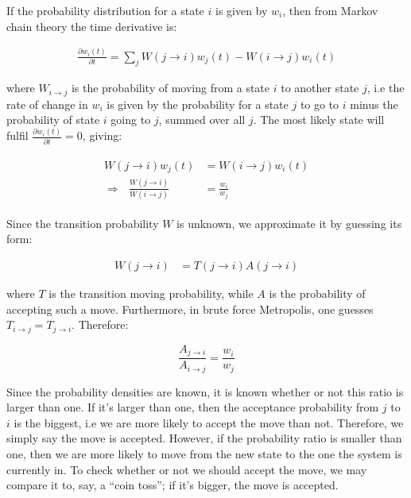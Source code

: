 \documentclass[english, a4paper]{article}
\begin{document}
	If the probability distribution for a state $i$ is given by $w_i$, then from Markov chain theory the time derivative is:
	
	\begin{align}
		\frac{\partial w_i(t)}{\partial t} = \sum_j W(j\rightarrow i)w_j(t) - W(i\rightarrow j)w_i(t)
	\end{align}
	
	where $W_{i\rightarrow j}$ is the probability of moving from a state $i$ to another state $j$, i.e the rate of change in $w_i$ is given by the probability for a state $j$ to go to $i$ minus the
	probability of state $i$ going to $j$, summed over all $j$.
	The most likely state will fulfil $\frac{\partial w_i(t)}{\partial t} = 0$, giving:
	
	\begin{align}
		\begin{split}
			W(j\rightarrow i)w_j(t) &=  W(i\rightarrow j)w_i(t)\\
			\Rightarrow\:\:\:\frac{  W(j\rightarrow i)}{  W(i\rightarrow j)} &= \frac{w_i}{w_j}
		\end{split}
	\end{align}
	
	Since the transition probability $W$ is unknown, we approximate it by guessing its form:
	
	\begin{align}
		W(j\rightarrow i) &= T(j\rightarrow i) A(j\rightarrow i)
	\end{align}
	
	where $T$ is the transition moving probability, while $A$ is the probability of accepting such a move. Furthermore, in brute force Metropolis, one guesses $T_{i\rightarrow j} = T_{j\rightarrow i}$.
	Therefore:
	
	\begin{equation}
		\frac{A_{j\rightarrow i}}{A_{i\rightarrow j}} = \frac{w_i}{w_j}
	\end{equation}
	
	Since the probability densities are known, it is known whether or not this ratio is larger than one. If it's larger than one, then the acceptance probability from $j$ to $i$ is the biggest, i.e we are more likely to accept the move than not.
	Therefore, we simply say the move is accepted. However, if the probability ratio is smaller than one, then we are more likely to move from the new state to the one the system is currently in.
	To check whether or not we should accept the move, we may compare it to, say, a ``coin toss''; if it's bigger, the move is accepted.\\
	
\end{document}
